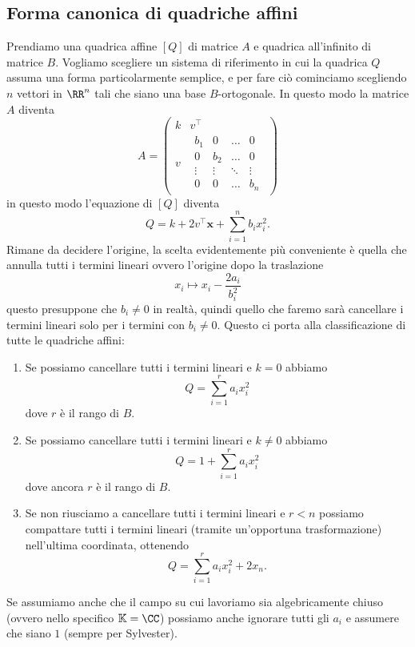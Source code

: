 \documentclass[11pt]{scrartcl}
\newcommand{\KK}{\mathbb{K}}
\begin{document}
	\subsection{Forma canonica di quadriche affini}
	Prendiamo una quadrica affine $[Q]$ di matrice $A$ e quadrica all'infinito di matrice $B$. Vogliamo scegliere un sistema di riferimento in cui la quadrica $Q$ assuma una forma particolarmente semplice, e per fare ciò cominciamo scegliendo $n$ vettori in $\RR^n$ tali che siano una base $B$-ortogonale. In questo modo la matrice $A$ diventa
	$$
	A=
	\left(
	\begin{array}{c|c}
		k & v^\intercal \\
		\hline
		v & \begin{array}{cccc}
				b_1 & 0 & \dots & 0 \\
				0 & b_2 & \dots & 0 \\
				\vdots & \vdots & \ddots & \vdots \\
				0 & 0 & \dots & b_n
			\end{array}
	\end{array}
	\right)
	$$
	in questo modo l'equazione di $[Q]$ diventa
	$$Q=k+2v^\intercal \mathbf{x}+\sum_{i=1}^{n}b_ix_i^2.$$
	Rimane da decidere l'origine, la scelta evidentemente più conveniente è quella che annulla tutti i termini lineari ovvero l'origine dopo la traslazione 
	$$x_i \mapsto x_i-\frac{2a_i}{b_i^2}$$
	questo presuppone che $b_i\ne 0$ in realtà, quindi quello che faremo sarà cancellare i termini lineari solo per i termini con $b_i\ne 0$. Questo ci porta alla classificazione di tutte le quadriche affini:
	\begin{enumerate}
		\item Se possiamo cancellare tutti i termini lineari e $k=0$ abbiamo
		$$Q=\sum_{i=1}^r a_ix_i^2$$
		dove $r$ è il rango di $B$.
		\item Se possiamo cancellare tutti i termini lineari e $k\ne 0$ abbiamo
		$$Q=1+\sum_{i=1}^r a_ix_i^2$$
		dove ancora $r$ è il rango di $B$.
		\item Se non riusciamo a cancellare tutti i termini lineari e $r<n$ possiamo compattare tutti i termini lineari (tramite un'opportuna trasformazione) nell'ultima coordinata, ottenendo
		$$Q=\sum_{i=1}^{r}a_ix_i^2+2x_n.$$
	\end{enumerate}
	Se assumiamo anche che il campo su cui lavoriamo sia algebricamente chiuso (ovvero nello specifico $\KK=\CC$) possiamo anche ignorare tutti gli $a_i$ e assumere che siano $1$ (sempre per Sylvester).
	
\end{document}
